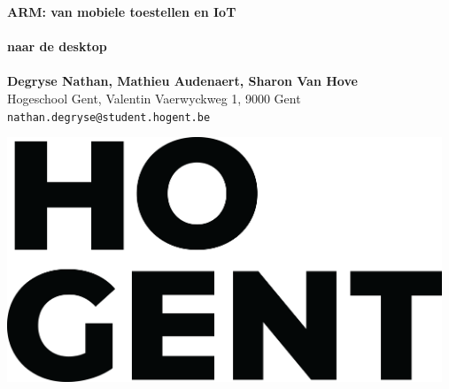 \documentclass[a0,portrait]{a0poster}
\begin{document}


\begin{minipage}[t]{0.75\linewidth}
\VeryHuge \color{HoGentAccent1} \textbf{ARM: van mobiele toestellen en IoT \\\\naar de desktop } \color{Black}\\ %
\\
\huge \textbf{Degryse Nathan, Mathieu Audenaert, Sharon Van Hove}\\[0.5cm] %
\huge Hogeschool Gent, Valentin Vaerwyckweg 1, 9000 Gent\\[0.4cm] %
\Large \texttt{nathan.degryse@student.hogent.be} \\
\end{minipage}
%
\begin{minipage}[t]{0.25\linewidth}
\includegraphics[width=13cm,right]{figures/HOGENT_Logo_Pos_rgb.png} 

\end{minipage}

\vspace{1cm} %
\end{document}
